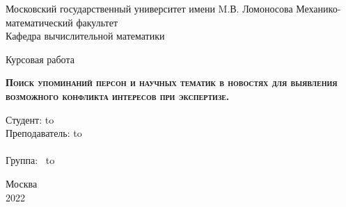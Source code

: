 \begin{titlepage}
\newpage
\begin{center}
Московский государственный университет имени M.В. Ломоносова
Механико-математический факультет \\
Кафедра вычислительной математики \\
\end{center}

\vspace{8em}

\begin{center}
\Large Курсовая работа \\ 
\end{center}

\vspace{2em}

\begin{center}
\textsc{\textbf{Поиск упоминаний персон и научных тематик в новостях для выявления возможного конфликта интересов при экспертизе.}}
\end{center}

\vspace{24em}



\newbox{\lbox}
\newlength{\maxl}
\setlength{\maxl}{\wd\lbox}
\hfill\parbox{13cm}{
\hspace*{5cm}\hspace*{-5cm}Студент: \qquad\qquad\hbox to\\
\hspace*{5cm}\hspace*{-5cm}Преподаватель: \hbox to\\
\\
\hspace*{5cm}\hspace*{-5cm}Группа:\qquad\qquad $\;\:$ \hbox to\\
}


\vspace{\fill}

\begin{center}
Москва \\2022
\end{center}

\end{titlepage}
\newpage